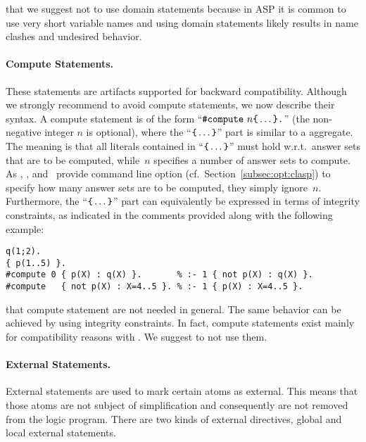\begin{Note}
that we suggest not to use domain statements because 
in ASP it is common to use very short variable names and
using domain statements likely results in name clashes
and undesired behavior.
\end{Note}

\paragraph{Compute Statements.}
%
These statements are artifacts supported for backward compatibility.
Although we strongly recommend to avoid compute statements,
we now describe their syntax.
A compute statement is of the form
``$\const{\#compute}~n \code{\char`\{}\dots\code{\char`\}}\code{.}$''
(the non-negative integer $n$ is optional),
where the ``$\code{\char`\{}\dots\code{\char`\}}$'' part
is similar to a  aggregate.
The meaning is that all literals contained in
``$\code{\char`\{}\dots\code{\char`\}}$'' must hold w.r.t.\ answer sets
that are to be computed,
while~$n$ specifies a number of answer sets to compute.
As \clasp, \clingo, and \iclingo\ provide command line option
 (cf.\ Section~\ref{subsec:opt:clasp})
to specify how many answer sets are to be computed,
they simply ignore~$n$.
Furthermore,
the ``$\code{\char`\{}\dots\code{\char`\}}$'' part can equivalently
be expressed in terms of integrity constraints,
as indicated in the comments provided along with the following example:
%
\begin{lstlisting}[xrightmargin=-20pt,numbers=none]
q(1;2).
{ p(1..5) }.
#compute 0 { p(X) : q(X) }.       % :- 1 { not p(X) : q(X) }.
#compute   { not p(X) : X=4..5 }. % :- 1 { p(X) : X=4..5 }.
\end{lstlisting}

\begin{Note}
that compute statement are not needed in general.
The same behavior can be achieved by using integrity constraints.
In fact, compute statements exist mainly for compatibility reasons with \lparse.
We suggest to not use them.
\end{Note}

\paragraph{External Statements.}
%
External statements are used to mark certain atoms as external. This means 
that those atoms are not subject of simplification and consequently are not removed 
from the logic program. There are two kinds of external directives, 
global and local external statements.

